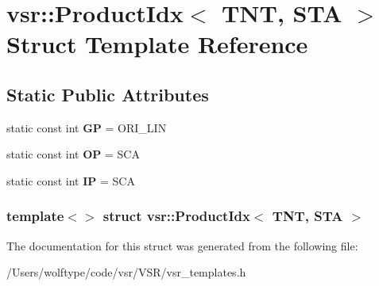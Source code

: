 \hypertarget{structvsr_1_1_product_idx_3_01_t_n_t_00_01_s_t_a_01_4}{\section{vsr\-:\-:Product\-Idx$<$ T\-N\-T, S\-T\-A $>$ Struct Template Reference}
\label{structvsr_1_1_product_idx_3_01_t_n_t_00_01_s_t_a_01_4}
}
\subsection*{Static Public Attributes}
\begin{DoxyCompactItemize}
\item 
\hypertarget{structvsr_1_1_product_idx_3_01_t_n_t_00_01_s_t_a_01_4_ab1c38ac0e7ff9fb97eb0a7a016427fbb}{static const int {\bfseries G\-P} = O\-R\-I\-\_\-\-L\-I\-N}\label{structvsr_1_1_product_idx_3_01_t_n_t_00_01_s_t_a_01_4_ab1c38ac0e7ff9fb97eb0a7a016427fbb}

\item 
\hypertarget{structvsr_1_1_product_idx_3_01_t_n_t_00_01_s_t_a_01_4_ae6d598df97c12f7002ded9ba438bd0f8}{static const int {\bfseries O\-P} = S\-C\-A}\label{structvsr_1_1_product_idx_3_01_t_n_t_00_01_s_t_a_01_4_ae6d598df97c12f7002ded9ba438bd0f8}

\item 
\hypertarget{structvsr_1_1_product_idx_3_01_t_n_t_00_01_s_t_a_01_4_a508893478203a221744fbb40c84044c7}{static const int {\bfseries I\-P} = S\-C\-A}\label{structvsr_1_1_product_idx_3_01_t_n_t_00_01_s_t_a_01_4_a508893478203a221744fbb40c84044c7}

\end{DoxyCompactItemize}
\subsubsection*{template$<$$>$ struct vsr\-::\-Product\-Idx$<$ T\-N\-T, S\-T\-A $>$}



The documentation for this struct was generated from the following file\-:\begin{DoxyCompactItemize}
\item 
/\-Users/wolftype/code/vsr/\-V\-S\-R/vsr\-\_\-templates.\-h\end{DoxyCompactItemize}

